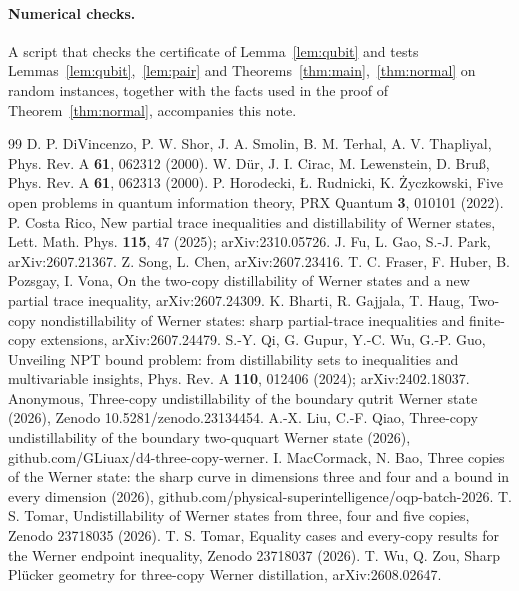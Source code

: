 \documentclass[11pt]{article}
\theoremstyle{remark}
\begin{document}
\paragraph{Numerical checks.} A script that checks the certificate of Lemma~\ref{lem:qubit} and tests
Lemmas~\ref{lem:qubit},~\ref{lem:pair} and Theorems~\ref{thm:main},~\ref{thm:normal} on random instances, together
with the facts used in the proof of Theorem~\ref{thm:normal}, accompanies this note.

\begin{thebibliography}{99}
 D. P. DiVincenzo, P. W. Shor, J. A. Smolin, B. M. Terhal, A. V. Thapliyal, Phys. Rev. A \textbf{61}, 062312 (2000).
 W. D\"ur, J. I. Cirac, M. Lewenstein, D. Bru\ss, Phys. Rev. A \textbf{61}, 062313 (2000).
 P. Horodecki, \L. Rudnicki, K. \.Zyczkowski, Five open problems in quantum information theory, PRX Quantum \textbf{3}, 010101 (2022).
 P. Costa Rico, New partial trace inequalities and distillability of Werner states, Lett. Math. Phys. \textbf{115}, 47 (2025); arXiv:2310.05726.
 J. Fu, L. Gao, S.-J. Park, arXiv:2607.21367.
 Z. Song, L. Chen, arXiv:2607.23416.
 T. C. Fraser, F. Huber, B. Pozsgay, I. Vona, On the two-copy distillability of Werner states and a new partial trace inequality, arXiv:2607.24309.
 K. Bharti, R. Gajjala, T. Haug, Two-copy nondistillability of Werner states: sharp partial-trace inequalities and finite-copy extensions, arXiv:2607.24479.
 S.-Y. Qi, G. Gupur, Y.-C. Wu, G.-P. Guo, Unveiling NPT bound problem: from distillability sets to inequalities and multivariable insights, Phys. Rev. A \textbf{110}, 012406 (2024); arXiv:2402.18037.
 Anonymous, Three-copy undistillability of the boundary qutrit Werner state (2026), Zenodo 10.5281/zenodo.23134454.
 A.-X. Liu, C.-F. Qiao, Three-copy undistillability of the boundary two-ququart Werner state (2026), github.com/GLiuax/d4-three-copy-werner.
 I. MacCormack, N. Bao, Three copies of the Werner state: the sharp curve in dimensions three and four and a bound in every dimension (2026), github.com/physical-superintelligence/oqp-batch-2026.
 T. S. Tomar, Undistillability of Werner states from three, four and five copies, Zenodo 23718035 (2026).
 T. S. Tomar, Equality cases and every-copy results for the Werner endpoint inequality, Zenodo 23718037 (2026).
 T. Wu, Q. Zou, Sharp Pl\"ucker geometry for three-copy Werner distillation, arXiv:2608.02647.
\end{thebibliography}
\end{document}
